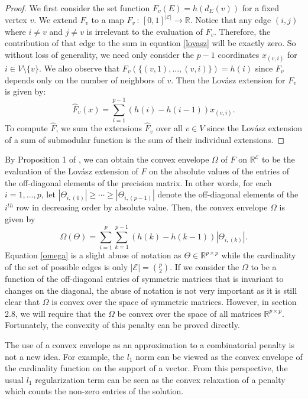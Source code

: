\documentclass{uwstat572}
\theoremstyle{remark}
\theoremstyle{definition}
\begin{document}
\begin{proof}
We first consider the set function $F_v(E) = h(d_E(v))$ for a fixed vertex $v$. We extend $F_v$ to a map  $\hat{F}_v \, : \, [0,1]^{|\mathcal{E}|} \to \mathbb{R}$.  Notice that any edge $(i,j)$ where $i \neq v$ and $j \neq v$ is irrelevant to the evaluation of $F_v$. Therefore, the contribution of that edge to the sum in equation \eqref{lovasz} will be exactly zero. So without loss of generality, we need only consider the $p-1$ coordinates $x_{(v,i)}$ for $i \in V \setminus \{v\}$.  We also observe that $F_v( \{(v,1),...,(v,i)\}) = h(i)$ since $F_v$ depends only on the number of neighbors of $v$. Then the Lov{\'a}sz extension for $F_v$ is given by:
\begin{equation*}
    \hat{F}_v(x) = \sum_{i = 1}^{p-1} (h(i) - h(i-1)) x_{(v,i)}.
\end{equation*}
To compute $\hat{F}$, we sum the extensions $\hat{F}_v$ over all $v \in V$ since the Lov{\'a}sz extension of a sum of submodular function is the sum of their individual extensions.
\end{proof}


By Proposition 1 of \cite{bach2010}, we can obtain the convex envelope $\Omega$ of $F$ on $\mathbb{R}^{\mathcal{E}}$ to be the evaluation of the Lov{\'a}sz extension of $F$ on the absolute values of the entries of the off-diagonal elements of the precision matrix.  In other words, for each $i = 1,...,p$,  let $|\Theta_{i,(0)}| \geq \cdots \geq |\Theta_{i,(p-1)}|$ denote the off-diagonal elements of the $i^{th}$ row in decreasing order by absolute value.  Then, the convex envelope $\Omega$ is given by
\begin{equation}\label{omega}
\Omega(\Theta) = \sum_{i=1}^p \sum_{k=1}^{p-1} (h(k) - h(k-1)) | \Theta_{i,(k)}|.
\end{equation}
Equation \eqref{omega} is a slight abuse of notation as $\Theta \in \mathbb{R}^{p \times p}$ while the cardinality of the set of possible edges is only $|\mathcal{E}| = \binom{p}{2}$.  If we consider the $\Omega$ to be a function of the off-diagonal entries of symmetric matrices that is invariant to changes on the diagonal, the abuse of notation is not very important as it is still clear that $\Omega$ is convex over the space of symmetric matrices.  However, in section 2.8, we will require that the $\Omega$ be convex over the space of all matrices $\mathbb{R}^{p \times p}$. Fortunately, the convexity of this penalty can be proved directly.  

The use of a convex envelope as an approximation to a combinatorial penalty is not a new idea.  For example, the $l_1$ norm can be viewed as the convex envelope of the cardinality function on the support of a vector.  From this perspective, the usual $l_1$ regularization term can be seen as the convex relaxation of a penalty which counts the non-zero entries of the solution.
\end{document}
